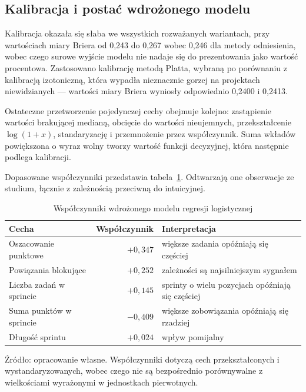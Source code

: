\subsection{Kalibracja i postać wdrożonego modelu}

Kalibracja okazała się słaba we wszystkich rozważanych wariantach, przy wartościach miary Briera od 0,243 do 0,267 wobec 0,246 dla metody odniesienia, wobec czego surowe wyjście modelu nie nadaje się do prezentowania jako wartość procentowa. Zastosowano kalibrację metodą Platta, wybraną po porównaniu z kalibracją izotoniczną, która wypadła nieznacznie gorzej na projektach niewidzianych — wartości miary Briera wyniosły odpowiednio 0,2400 i 0,2413.

Ostateczne przetworzenie pojedynczej cechy obejmuje kolejno: zastąpienie wartości brakującej medianą, obcięcie do wartości nieujemnych, przekształcenie \(\log(1+x)\), standaryzację i przemnożenie przez współczynnik. Suma wkładów powiększona o wyraz wolny tworzy wartość funkcji decyzyjnej, która następnie podlega kalibracji.

Dopasowane współczynniki przedstawia tabela~\ref{tab:wspolczynniki-modelu}. Odtwarzają one obserwacje ze studium, łącznie z zależnością przeciwną do intuicyjnej.

\begin{table}[htbp]
    \centering
    \small
    \caption{Współczynniki wdrożonego modelu regresji logistycznej}
    \label{tab:wspolczynniki-modelu}
    \begin{tabularx}{\textwidth}{@{}lrX@{}}
        \toprule
        \textbf{Cecha} & \textbf{Współczynnik} & \textbf{Interpretacja} \\
        \midrule
        Oszacowanie punktowe & $+0{,}347$ & większe zadania opóźniają się częściej \\
        Powiązania blokujące & $+0{,}252$ & zależności są najsilniejszym sygnałem \\
        Liczba zadań w sprincie & $+0{,}145$ & sprinty o wielu pozycjach opóźniają się częściej \\
        Suma punktów w sprincie & $-0{,}409$ & większe zobowiązania opóźniają się rzadziej \\
        Długość sprintu & $+0{,}024$ & wpływ pomijalny \\
        \bottomrule
    \end{tabularx}

    \par\smallskip
    \begin{minipage}{\textwidth}
        \footnotesize
        Źródło: opracowanie własne. Współczynniki dotyczą cech przekształconych
        i wystandaryzowanych, wobec czego nie są bezpośrednio porównywalne
        z wielkościami wyrażonymi w jednostkach pierwotnych.
    \end{minipage}
\end{table}


